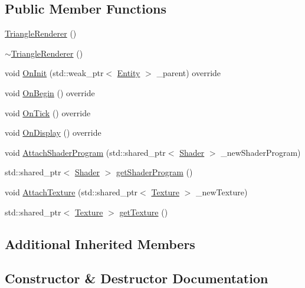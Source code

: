 \subsection*{Public Member Functions}
\begin{DoxyCompactItemize}
\item 
\hyperlink{classmyengine_1_1_triangle_renderer_a5b8c8b84f420ef262c0409a6fe5340b4}{Triangle\+Renderer} ()
\item 
\hyperlink{classmyengine_1_1_triangle_renderer_a5802b748911e8f3a4a4bbc2411c98ef7}{$\sim$\+Triangle\+Renderer} ()
\item 
void \hyperlink{classmyengine_1_1_triangle_renderer_aef2e04f1dd0419df1a60eb0cd95fd86c}{On\+Init} (std\+::weak\+\_\+ptr$<$ \hyperlink{classmyengine_1_1_entity}{Entity} $>$ \+\_\+parent) override
\item 
void \hyperlink{classmyengine_1_1_triangle_renderer_a74b0a056ed77e78a5061da2da6115bfd}{On\+Begin} () override
\item 
void \hyperlink{classmyengine_1_1_triangle_renderer_a6608a9c7954cff50e2575133dd6e5d88}{On\+Tick} () override
\item 
void \hyperlink{classmyengine_1_1_triangle_renderer_a266db93e50781c64232b16fe4f323bad}{On\+Display} () override
\item 
void \hyperlink{classmyengine_1_1_triangle_renderer_ae19ddcd41f6950a92744de0a17c43dbf}{Attach\+Shader\+Program} (std\+::shared\+\_\+ptr$<$ \hyperlink{classmyengine_1_1_shader}{Shader} $>$ \+\_\+new\+Shader\+Program)
\item 
std\+::shared\+\_\+ptr$<$ \hyperlink{classmyengine_1_1_shader}{Shader} $>$ \hyperlink{classmyengine_1_1_triangle_renderer_a4cc3d6924704e3cd2f2d9a499e1e93e7}{get\+Shader\+Program} ()
\item 
void \hyperlink{classmyengine_1_1_triangle_renderer_ab1c61a5a8ba4006e59e1838c69c54808}{Attach\+Texture} (std\+::shared\+\_\+ptr$<$ \hyperlink{classmyengine_1_1_texture}{Texture} $>$ \+\_\+new\+Texture)
\item 
std\+::shared\+\_\+ptr$<$ \hyperlink{classmyengine_1_1_texture}{Texture} $>$ \hyperlink{classmyengine_1_1_triangle_renderer_af5d1eae8138be9782577417eb8bd47ac}{get\+Texture} ()
\end{DoxyCompactItemize}
\subsection*{Additional Inherited Members}


\subsection{Constructor \& Destructor Documentation}
\mbox{\label{classmyengine_1_1_triangle_renderer_a5b8c8b84f420ef262c0409a6fe5340b4}} 
